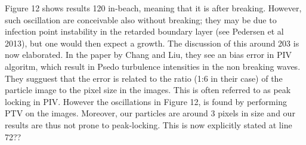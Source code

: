 Figure 12 shows results 120 in-beach, meaning that it is after breaking. However, such oscillation are conceivable
also without breaking; they may be due to infection point instability in the retarded boundary layer (see Pedersen et al 2013), but one would then expect a growth. The discussion of this around 203 is now elaborated. 
 In the paper by Chang and Liu, they see an bias error in PIV algoritm, which result in Psedo turbulence intensities in the non breaking waves. They sugguest that the error is related to the ratio (1:6 in their case) of the particle image to the pixel size in the images. This is often referred to as peak locking in PIV. However the oscillations in Figure 12, is found by  performing PTV on the images. Moreover, our particles are around 3 pixels in size and
our results are thus not prone to peak-locking. This is now explicitly stated
at line 72?? 

